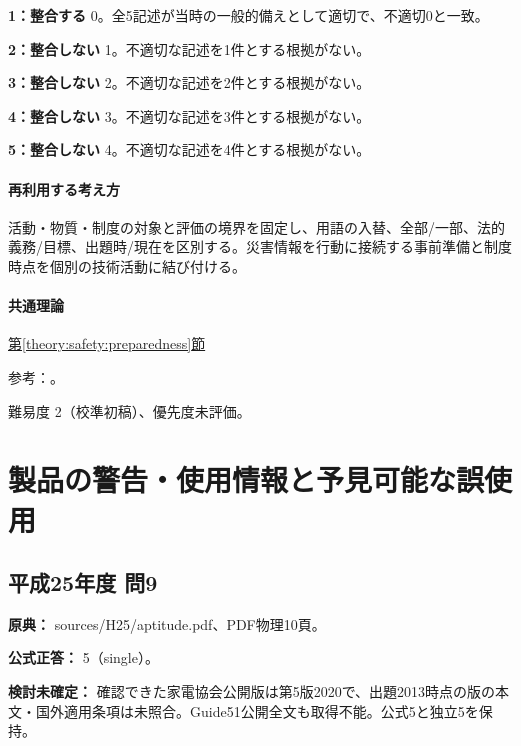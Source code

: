 \noindent\textbf{1：整合する} 0。全5記述が当時の一般的備えとして適切で、不適切0と一致。\par

\noindent\textbf{2：整合しない} 1。不適切な記述を1件とする根拠がない。\par

\noindent\textbf{3：整合しない} 2。不適切な記述を2件とする根拠がない。\par

\noindent\textbf{4：整合しない} 3。不適切な記述を3件とする根拠がない。\par

\noindent\textbf{5：整合しない} 4。不適切な記述を4件とする根拠がない。\par

\paragraph{再利用する考え方} 活動・物質・制度の対象と評価の境界を固定し、用語の入替、全部/一部、法的義務/目標、出題時/現在を区別する。災害情報を行動に接続する事前準備と制度時点を個別の技術活動に結び付ける。

\paragraph{共通理論} \hyperref[theory:safety:preparedness]{第\ref*{theory:safety:preparedness}節}

\par 参考：\cite{env_ar5,env_rain2017,env_evac2021,env_warning2026}。

\par 難易度 2（校準初稿）、優先度未評価。

\section{製品の警告・使用情報と予見可能な誤使用}

\subsection{平成25年度 問9}
\label{q:h25-reg-apt-09}

\noindent\textbf{原典：} sources/H25/aptitude.pdf、PDF物理10頁。

\textbf{公式正答：} 5（single）。

\par\textbf{検討未確定：} 確認できた家電協会公開版は第5版2020で、出題2013時点の版の本文・国外適用条項は未照合。Guide51公開全文も取得不能。公式5と独立5を保持。


